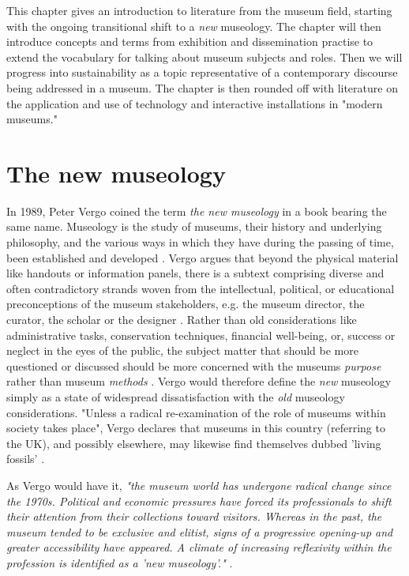 
This chapter gives an introduction to literature from the museum field, starting with the ongoing transitional shift to a \emph{new} museology. The chapter will then introduce concepts and terms from exhibition and dissemination practise to extend the vocabulary for talking about museum subjects and roles. Then we will progress into sustainability as a topic representative of a contemporary discourse being addressed in a museum. The chapter is then rounded off with literature on the application and use of technology and interactive installations in "modern museums."

\section{The new museology}
In 1989, Peter Vergo coined the term \emph{the new museology} in a book bearing the same name. Museology is the study of museums, their history and underlying philosophy, and the various ways in which they have during the passing of time, been established and developed \autocite[p.1]{vergo_museology_1989}. Vergo argues that beyond the physical material like handouts or information panels, there is a subtext comprising diverse and often contradictory strands woven from the intellectual, political, or educational preconceptions of the museum stakeholders, e.g. the museum director, the curator, the scholar or the designer \autocite[p.3]{vergo_museology_1989}. Rather than old considerations like administrative tasks, conservation techniques, financial well-being, or, success or neglect in the eyes of the public, the subject matter that should be more questioned or discussed should be more concerned with the museums \emph{purpose} rather than museum \emph{methods} \autocite[p.3]{vergo_museology_1989}. Vergo would therefore define the \emph{new} museology simply as a state of widespread dissatisfaction with the \emph{old} museology considerations. "Unless a radical re-examination of the role of museums within society takes place", Vergo declares that museums in this country (referring to the UK), and possibly elsewhere, may likewise find themselves dubbed 'living fossils' \autocite[p.4]{vergo_museology_1989}.

As Vergo would have it, \emph{"the museum world has undergone radical change since the 1970s. Political and economic pressures have forced its professionals to shift their attention from their collections toward visitors. Whereas in the past, the museum tended to be exclusive and elitist, signs of a progressive opening-up and greater accessibility have appeared. A climate of increasing reflexivity within the profession is identified as a 'new museology'."} \autocite[p. 84]{ross_interpreting_2015}.

